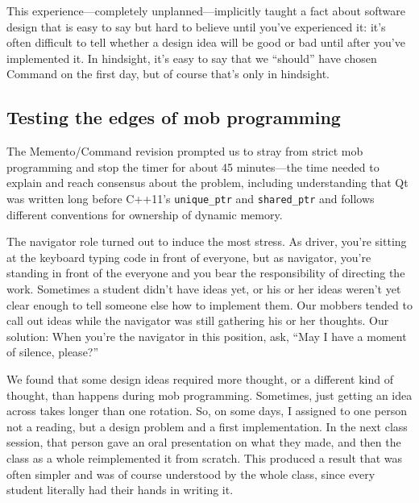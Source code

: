 \documentclass{article}
\begin{document}
This experience---completely unplanned---implicitly taught a fact about
software design that is easy to say but hard to believe until you've
experienced it: it's often difficult to tell whether a design idea will be
good or bad until after you've implemented it. In hindsight, it's easy to say
that we ``should'' have chosen Command on the first day, but of course that's
only in hindsight. 

\subsection{Testing the edges of mob programming}

The Memento/Command revision prompted us to stray from strict mob
programming and stop the timer for about 45 minutes---the time needed to
explain and reach consensus about the problem, including understanding that Qt
was written long before C++11's \texttt{unique\_ptr} and \texttt{shared\_ptr}
and follows different conventions for ownership of dynamic memory.

The navigator role turned out to induce the most stress. As
driver, you're sitting at the keyboard typing code in front of everyone, but
as navigator, you're standing in front of the everyone and you bear the
responsibility of directing the work. Sometimes a student didn't have ideas
yet, or his or her ideas weren't yet clear enough to tell someone else how to
implement them. Our mobbers tended to call out ideas while the navigator was
still gathering his or her thoughts.
Our solution: When you're the navigator in this position, ask, ``May I have
a moment of silence, please?''

We found that some design ideas required more thought, or a different
kind of thought, than happens during mob programming. Sometimes, just getting
an idea across takes longer than one rotation. So, on some days, I assigned
to one person not a reading, but a design problem and a first implementation.
In the next class session, that person gave an oral presentation on what they
made, and then the class as a whole reimplemented it from scratch. This
produced a result that was often simpler and was of course understood by the
whole class, since every student literally had their hands in writing it.

\begin{comment}
``common knowledge''

The day I improvised a lecture on agile vs. waterfall. Previous exposure had
given some students the impression that agile is hopelessly high-risk
because it has no discipline and other
students the impression that waterfall is hopelessly high-risk because it's
inflexible and assumes perfect forethought.

Some students had previous experience with Git and some did not.

No textbooks.

Danger: what if a prima donna shows up?

quiet students not asking questions, not having their problems addressed---not
a problem now
\end{comment}
\end{document}
